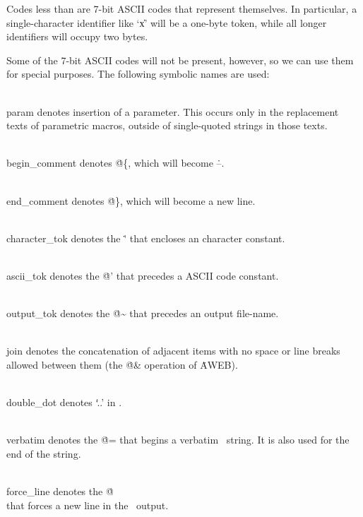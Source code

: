 Codes less than  are 7-bit ASCII codes that represent themselves.
In particular, a single-character identifier like `\|x' will be a one-byte
token, while all longer identifiers will occupy two bytes.

Some of the 7-bit ASCII codes will not be present, however, so we can
use them for special purposes. The following symbolic names are used:

\yskip\hang \\{param} denotes insertion of a parameter. This occurs only in
the replacement texts of parametric macros, outside of single-quoted strings
in those texts.

\hang \\{begin\_comment} denotes \.{@\{}, which will become \.{--}.

\hang \\{end\_comment} denotes \.{@\}}, which will become a new line.

\hang \\{character\_tok} denotes the \.' that encloses an character constant.

\hang \\{ascii\_tok} denotes the \.{@'} that precedes a ASCII code constant.

\hang \\{output\_tok} denotes the \.{@\~} that precedes an output file-name.

\hang \\{join} denotes the concatenation of adjacent items with no
space or line breaks allowed between them (the \.{@\&} operation of \.{AWEB}).

\hang \\{double\_dot} denotes `\.{..}' in \ADA.

\hang \\{verbatim} denotes the \.{@=} that begins a verbatim \ADA\ string.
It is also used for the end of the string.

\hang \\{force\_line} denotes the \.{@\\} that forces a new line in the
\ADA\ output.

